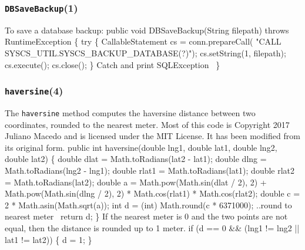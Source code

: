\documentclass{article}
\def\nwendcode{\endtrivlist \endgroup}
\let\nwdocspar=\par
\theoremstyle{definition}
\begin{document}
\subsubsection{{\tt{}DBSaveBackup}(1)}
To save a database backup:
\nwenddocs{}\endmoddef{}
public void DBSaveBackup(String filepath) throws RuntimeException \{
  try \{
    CallableStatement cs = conn.prepareCall(
      "CALL SYSCS_UTIL.SYSCS_BACKUP_DATABASE(?)");
    cs.setString(1, filepath);
    cs.execute();
    cs.close();
  \}
  \LA{}Catch and print \code{}SQLException\edoc{}~{\nwtagstyle{}}\RA{}
\}
\nwendcode{}\nwdocspar

\subsubsection{{\tt{}\protect{}\protect{}haversine}(4)}
The {\tt{}\protect{}haversine} method computes the haversine distance between two
coordinates, rounded to the nearest meter.  Most of this code is Copyright 2017
Juliano Macedo and is licensed under the MIT License. It has been modified from
its original form.
\nwenddocs{}\endmoddef{}
public int haversine(double lng1, double lat1, double lng2, double lat2) \{
  double dlat = Math.toRadians(lat2 - lat1);
  double dlng = Math.toRadians(lng2 - lng1);
  double rlat1 = Math.toRadians(lat1);
  double rlat2 = Math.toRadians(lat2);
  double a = Math.pow(Math.sin(dlat / 2), 2)
    + Math.pow(Math.sin(dlng / 2), 2)
    * Math.cos(rlat1) * Math.cos(rlat2);
  double c = 2 * Math.asin(Math.sqrt(a));
  int d = (int) Math.round(c * 6371000);
  \LA{}..round to nearest meter~{\nwtagstyle{}}\RA{}
  return d;
\}
\eatline
{}\nwendcode{}If the nearest meter is 0 and the two points are not equal, then the distance
is rounded up to 1 meter.
\nwenddocs{}\endmoddef{}
if (d == 0 && (lng1 != lng2 || lat1 != lat2)) \{
  d = 1;
\}
\nwendcode{}\nwdocspar
\end{document}
